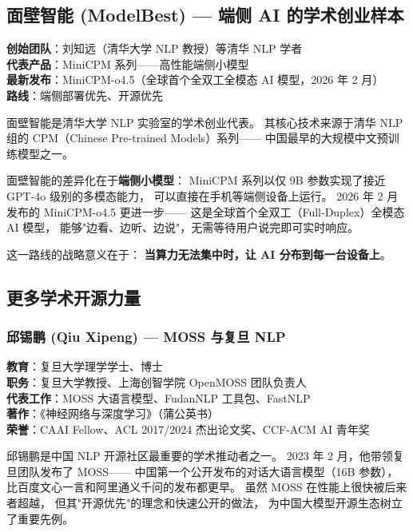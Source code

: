 \subsection{面壁智能 (ModelBest) — 端侧 AI 的学术创业样本}

\begin{keybox}[面壁智能核心信息]
\textbf{创始团队}：刘知远（清华大学 NLP 教授）等清华 NLP 学者 \\
\textbf{代表产品}：MiniCPM 系列——高性能端侧小模型 \\
\textbf{最新发布}：MiniCPM-o4.5（全球首个全双工全模态 AI 模型，2026 年 2 月）\\
\textbf{路线}：端侧部署优先、开源优先
\end{keybox}

面壁智能是清华大学 NLP 实验室的学术创业代表。
其核心技术来源于清华 NLP 组的 CPM（Chinese Pre-trained Models）系列——
中国最早的大规模中文预训练模型之一。

面壁智能的差异化在于\textbf{端侧小模型}：
MiniCPM 系列以仅 9B 参数实现了接近 GPT-4o 级别的多模态能力，
可以直接在手机等端侧设备上运行。
2026 年 2 月发布的 MiniCPM-o4.5 更进一步——
这是全球首个全双工（Full-Duplex）全模态 AI 模型，
能够"边看、边听、边说"，无需等待用户说完即可实时响应。

这一路线的战略意义在于：
\textbf{当算力无法集中时，让 AI 分布到每一台设备上}。


\subsection{更多学术开源力量}

\subsubsection{邱锡鹏 (Qiu Xipeng) — MOSS 与复旦 NLP}

\begin{keybox}
\textbf{教育}：复旦大学理学学士、博士 \\
\textbf{职务}：复旦大学教授、上海创智学院 OpenMOSS 团队负责人 \\
\textbf{代表工作}：MOSS 大语言模型、FudanNLP 工具包、FastNLP \\
\textbf{著作}：《神经网络与深度学习》（蒲公英书）\\
\textbf{荣誉}：CAAI Fellow、ACL 2017/2024 杰出论文奖、CCF-ACM AI 青年奖
\end{keybox}

邱锡鹏是中国 NLP 开源社区最重要的学术推动者之一。
2023 年 2 月，他带领复旦团队发布了 MOSS——
中国第一个公开发布的对话大语言模型（16B 参数），
比百度文心一言和阿里通义千问的发布都更早。
虽然 MOSS 在性能上很快被后来者超越，
但其"开源优先"的理念和快速公开的做法，
为中国大模型开源生态树立了重要先例。


